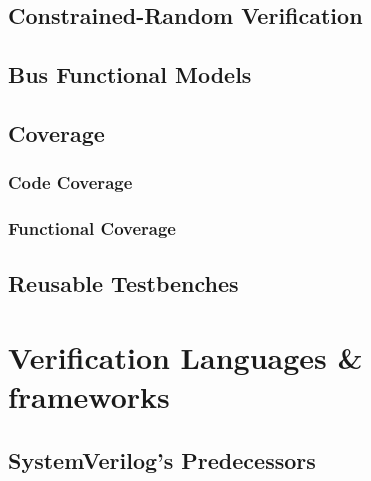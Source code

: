 \documentclass[12pt]{report}
\begin{document}
\subsection{Constrained-Random Verification} %

\cite{Mehta2021}

\subsection{Bus Functional Models} %

\subsection{Coverage} %

\subsubsection{Code Coverage} %

\subsubsection{Functional Coverage} %

\subsection{Reusable Testbenches} %

\section{Verification Languages \& frameworks} %

\subsection{SystemVerilog's Predecessors} %
\end{document}
